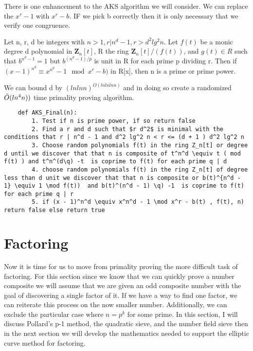 \documentclass{article}
\begin{document}
There is one enhancement to the AKS algorithm we will consider. We can replace the $x^r - 1$ with $x^r - b$. IF we pick b correctly then it is only necessary that we verify one congruence. 
\begin{theorem}
    Let n, r, d be integers with $n  > 1, r | n^d - 1, r > d^2 lg^2 n$. Let $f(t)$ be a monic degree d polynomial in $\textbf{Z}_n [t]$, R the ring $\textbf{Z}_n [t] / (f(t))$, and $ g(t) \in R$ such that $b^{n^{d} -1} = 1$ but  $b^{(n^{d} -1) / p} $ is unit in R for each prime p dividing r. Then if $( x - 1)^{n^d} \equiv x^{n^d} - 1 \mod x^r -b )$ in R[x], then n is a prime or prime power. 
\end{theorem}\cite{gucciniefficient}
We can bound d by $(ln ln n)^{O ( ln ln ln n)}$ and in doing so create a randomized $\tilde{O}(ln^4 n))$ time  primality proving algorithm. 
\begin{verbatim}
    def AKS_Final(n):
        1. Test if n is prime power, if so return false
        2. Find a r and d such that $r d^2$ is minimal with the conditions that r | n^d - 1 and d^2 lg^2 n < r <= (d + 1 ) d^2 lg^2 n
        3. Choose random polynomials f(t) in the ring Z_n[t] or degree d until we discover that that n is composite of t^n^d \equiv t ( mod f(t) ) and t^n^(d\q) -t  is coprime to f(t) for each prime q | d
        4. choose random polynomials f(t) in the ring Z_n[t] of degree less than d unit we discover that that n is composite or b(t)^{n^d - 1} \equiv 1 \mod f(t))  and b(t)^(n^d - 1) \q) -1  is coprime to f(t) for each prime q | r
        5. if (x - 1)^n^d \equiv x^n^d - 1 \mod x^r - b(t) , f(t), n) return false else return true
\end{verbatim} 

\section{Factoring}
Now it is time for us to move from primality proving the more difficult task of factoring. For this section since we know that we can quickly prove a number composite we will assume that we are given an odd composite number with the goal of discovering a single factor of it. If we have a way to find one factor, we can reiterate this process on the now smaller number.  Additionally, we can exclude the particular case where $n = p^k$ for some prime. In this section, I will discuss Pollard's p-1 method, the quadratic sieve, and the number field sieve then in the next section we will develop the mathematics needed to support the elliptic curve method for factoring. 
\end{document}
